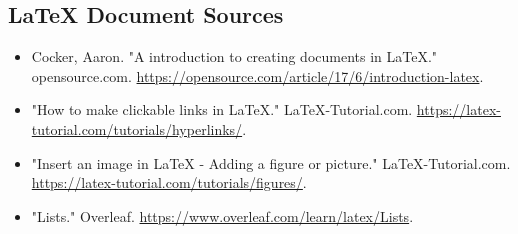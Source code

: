 \documentclass[12pt]{article}
\begin{document}
	\subsection{LaTeX Document Sources}

	\begin{itemize}
		\item Cocker, Aaron. "A introduction to creating documents in LaTeX." opensource.com. \url{https://opensource.com/article/17/6/introduction-latex}.
		\item "How to make clickable links in LaTeX." LaTeX-Tutorial.com. \url{https://latex-tutorial.com/tutorials/hyperlinks/}.
		\item "Insert an image in LaTeX - Adding a figure or picture." LaTeX-Tutorial.com. \url{https://latex-tutorial.com/tutorials/figures/}.
		\item "Lists." Overleaf. \url{https://www.overleaf.com/learn/latex/Lists}.
		
	\end{itemize}
		
\end{document}
